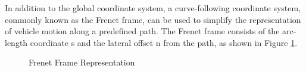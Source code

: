 In addition to the global coordinate system, a curve-following coordinate system, commonly known as the Frenet frame, can be used to simplify the
representation of vehicle motion along a predefined path.
The Frenet frame consists of the arc-length coordinate s and the lateral offset n from the path, as shown in Figure \ref{fig:frenet_frame}.

\begin{figure}[h]
	\centering
	\caption{Frenet Frame Representation}
	\label{fig:frenet_frame}
\end{figure}